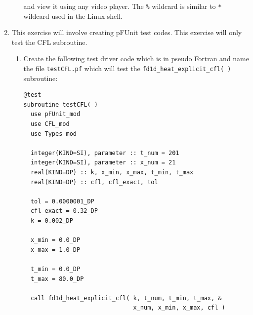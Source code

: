 \documentclass[12pt]{article}
\begin{document}
\begin{enumerate}
\begin{enumerate}
\begin{verbatim}
\end{verbatim}
and view it using any video player. The \texttt{\%} wildcard is similar to \texttt{*} wildcard used 
in the Linux shell. 
\end{enumerate}
\item This exercise will involve creating pFUnit test codes. This exercise will only
test the CFL subroutine. 
\begin{enumerate}
\item Create the following test driver code which is in pseudo Fortran and name the file \texttt{testCFL.pf} 
which will test the \texttt{fd1d\_heat\_explicit\_cfl( )} subroutine:
\begin{verbatim}
@test
subroutine testCFL( )
  use pFUnit_mod
  use CFL_mod
  use Types_mod

  integer(KIND=SI), parameter :: t_num = 201
  integer(KIND=SI), parameter :: x_num = 21
  real(KIND=DP) :: k, x_min, x_max, t_min, t_max 
  real(KIND=DP) :: cfl, cfl_exact, tol

  tol = 0.0000001_DP
  cfl_exact = 0.32_DP
  k = 0.002_DP

  x_min = 0.0_DP
  x_max = 1.0_DP

  t_min = 0.0_DP
  t_max = 80.0_DP
  
  call fd1d_heat_explicit_cfl( k, t_num, t_min, t_max, &
                               x_num, x_min, x_max, cfl )


\end{verbatim}
\end{enumerate}
\end{enumerate}
\end{document}
